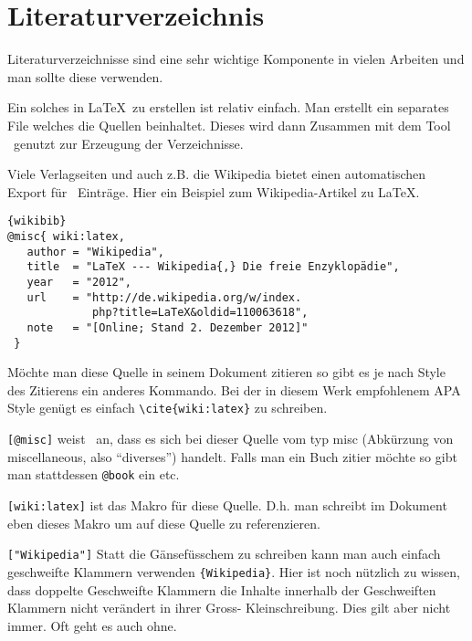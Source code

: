 \section{Literaturverzeichnis}

\noindent
Literaturverzeichnisse sind eine sehr wichtige Komponente
in vielen Arbeiten und man sollte diese verwenden.

Ein solches in \LaTeX~zu erstellen ist relativ einfach. Man
erstellt ein separates File welches die Quellen beinhaltet.
Dieses wird dann Zusammen mit dem Tool \BibTeX~genutzt zur
Erzeugung der Verzeichnisse. 

Viele Verlagseiten und auch z.B. die Wikipedia bietet einen automatischen
Export für \BibTeX~Einträge. Hier ein Beispiel zum Wikipedia-Artikel zu \LaTeX. \cite{wiki:latex}

\begin{center}
\begin{lstlisting}[caption=BibTeX Export aus Wikipedia]{wikibib}
@misc{ wiki:latex,
   author = "Wikipedia",
   title  = "LaTeX --- Wikipedia{,} Die freie Enzyklopädie",
   year   = "2012",
   url    = "http://de.wikipedia.org/w/index.
             php?title=LaTeX&oldid=110063618",
   note   = "[Online; Stand 2. Dezember 2012]"
 }
\end{lstlisting}
\end{center}

\noindent
Möchte man diese Quelle in seinem Dokument zitieren so gibt es je nach Style 
des Zitierens ein anderes Kommando. Bei der in diesem Werk empfohlenem APA Style
genügt es einfach \lstinline|\cite{wiki:latex}| zu schreiben.

\begin{description}
    \item \lstinline|[@misc]| weist \BibTeX~an, dass es sich bei dieser Quelle
    vom typ misc (Abkürzung von miscellaneous, also ``diverses'') handelt.
    Falls man ein Buch zitier möchte so gibt man stattdessen \lstinline|@book| 
    ein etc.
    \item \lstinline|[wiki:latex]| ist das Makro für diese Quelle. D.h. man 
    schreibt im Dokument eben dieses Makro um auf diese Quelle zu referenzieren.
    \item \lstinline|["Wikipedia"]| Statt die Gänsefüsschem zu schreiben kann man
    auch einfach geschweifte Klammern verwenden \lstinline|{Wikipedia}|.
    Hier ist noch nützlich zu wissen, dass doppelte Geschweifte Klammern  die 
    Inhalte innerhalb der Geschweiften Klammern nicht verändert in ihrer 
    Gross- Kleinschreibung. Dies gilt aber nicht immer. Oft geht es auch ohne.
\end{description}

